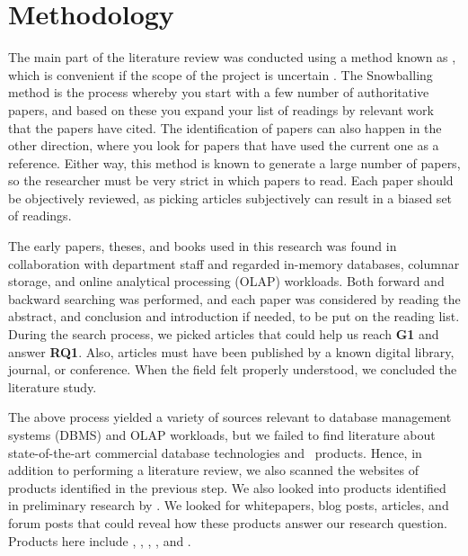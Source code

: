 \section{Methodology}
\label{sec:Methodology}
The main part of the literature review was conducted using a method known as , which is convenient if the scope of the project is uncertain \cite{Ang2014-nm}. The Snowballing method is the process whereby you start with a few number of authoritative papers, and based on these you expand your list of readings by relevant work that the papers have cited. The identification of papers can also happen in the other direction, where you look for papers that have used the current one as a reference. Either way, this method is known to generate a large number of papers, so the researcher must be very strict in which papers to read. Each paper should be objectively reviewed, as picking articles subjectively can result in a biased set of readings.

The early papers, theses, and books used in this research was found in collaboration with department staff and regarded in-memory databases, columnar storage, and online analytical processing (OLAP) workloads. Both forward and backward searching was performed, and each paper was considered by reading the abstract, and conclusion and introduction if needed, to be put on the reading list. During the search process, we picked articles that could help us reach \textbf{G1} and answer \textbf{RQ1}. Also, articles must have been published by a known digital library, journal, or conference. 
When the field felt properly understood, we concluded the  literature study.

The above process yielded a variety of sources relevant to database management systems (DBMS) and OLAP workloads, but we failed to find literature about state-of-the-art commercial database technologies and \bd~products. Hence, in addition to performing a  literature review, we also scanned the websites of products identified in the previous step. We also looked into products identified in preliminary research by \genus. We looked for whitepapers, blog posts, articles, and forum posts that could reveal how these products answer our research question. Products here include , , , , and .
